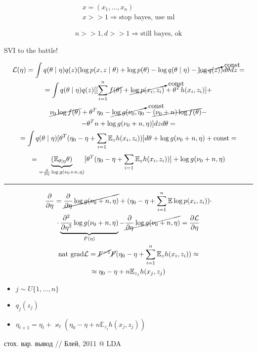 \documentclass{book}
\begin{document}
\begin{gather*}
    x=(x_1,\dots,x_n)\\
    x >> 1 \Rightarrow \textrm{stop bayes, use ml}
\end{gather*}

\begin{gather*}
  n>>1, d>>1 \Rightarrow \textrm{still bayes, ok}
\end{gather*}

SVI to the battle!

\begin{gather*}
    \mathcal{L}(\eta)=\int {q(\theta\mid \eta)q(z)(\log p(x,z\mid \theta)+\log p(\theta)-\log q(\theta\mid \eta)-\cancelto{\mathrm{const}}{\log q(z)})d\theta dz}=\\
    =\int {q(\theta\mid \eta)q(z)[[\sum_{i=1}^{n} \cancel{f(\theta)}+\cancelto{\mathrm{const}}{\log p(x_i,z_i)}+\theta^Th(x_i,z_i)]}+\\
    \cancel{\nu_0\log f(\theta)}+\theta^T\eta_0-\cancelto{\mathrm{const}}{\log g(\nu_0,\eta_0}-\cancel{(\nu_0+n)\log f(\theta)}-\\
    -\theta^Tn+\log g(\nu_0+n,\eta)]dzd\theta=\\
    =\int {q(\theta\mid \eta)[\theta^T(\eta_0-\eta+\sum_{i=1}^{} {\mathbb{E}_zh(x_i,z_i))]}d\theta}+\log g(\nu_0+n,\eta)+\mathrm{const}=\\
    =\underbrace{(\mathbb{E}_{\theta\mid \eta}\theta)}_{=\frac{\partial }{\partial \eta}\log g(\nu_0+n,\eta)}[\theta^T(\eta_0-\eta+\sum_{i=1}^{} {\mathbb{E}_zh(x_i,z_i)})]+\log g(\nu_0+n,\eta)
\end{gather*}

\hrule

\begin{gather*}
    \frac{\partial }{\partial \eta}=\cancel{\frac{\partial }{\partial \eta}\log g(\nu_0+n,\eta)}+(\eta_0-\eta+\sum_{i=1}^{n} {\mathbb{E}\log p(x_i,z_i)})\cdot\\
    \cdot \underbrace{\frac{\partial ^2}{\partial \eta^2}\log g(\nu_0+n,\eta)}_{F(\eta)}-\cancel{\frac{\partial }{\partial \eta}\log g(\nu_0+n,\eta)}=\frac{\partial \mathcal{L}}{\partial \eta}\\
    \mathrm{nat~grad}\mathcal{L}=\cancel{F^{-1}}\cancel{F}(\eta_0-\eta+\sum_{i=1}^{n} {\mathbb{E}_zh(x_i,z_i)})\approx\\
    \approx \eta_0-\eta+n\mathbb{E}_{z_j}h(x_j,z_j)
\end{gather*}

\begin{itemize}
    \item $j \sim U\{1,\dots,n\}$
    \item  $q_j(z_j)$
    \item $\eta_{t+1}=\eta_t+\varkappa_t\left(\eta_0-\eta+n\mathbb{E}_{z_j}h(x_j,z_j)\right)$
\end{itemize}

стох. вар. вывод // Блей, 2011 @ LDA
\end{document}
